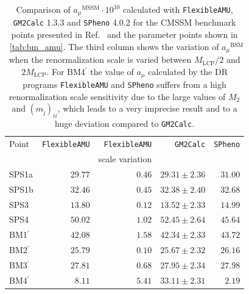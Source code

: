 \documentclass[final,3p,11pt,pdflatex]{elsarticle}
\makeatletter
\newcommand{\spheno}{\texttt{SPheno}\@\xspace}
\newcommand{\GMTCalc}{\texttt{GM2Calc}\@\xspace}
\newcommand{\famu}{\texttt{FlexibleAMU}\@\xspace}
\newcommand{\ol}[1]{\overline{#1}}
\newcommand{\DRbar}{\ensuremath{\ol{\text{DR}}}\xspace}
\newcommand{\BSM}{\ensuremath{\text{BSM}}\xspace}
\newcommand{\MSSM}{\ensuremath{\text{MSSM}}\xspace}
\newcommand{\MLCP}{\ensuremath{M_\text{LCP}}\xspace}
\newcommand{\amu}{\ensuremath{a_\mu}\xspace}
\newcommand{\amuBSM}{\ensuremath{\amu^{\BSM}}\xspace}
\newcommand{\amuMSSM}{\ensuremath{\amu^{\MSSM}}\xspace}
\newcommand{\tabref}[1]{\tablename~\ref{#1}}
\makeatother
\begin{document}
\begin{table}[tbh]
  \centering
  \begin{tabular}{lrrrr}
    \toprule
    Point & \famu & \famu           & \GMTCalc & \spheno \\
          &       & scale variation &          &         \\
    \midrule
    SPS1a  & $29.77$ & $0.46$ & $29.31 \pm 2.36$ & $31.00$ \\
    SPS1b  & $32.46$ & $0.45$ & $32.38 \pm 2.40$ & $32.68$ \\
    SPS3   & $13.80$ & $0.12$ & $13.52 \pm 2.33$ & $14.99$ \\
    SPS4   & $50.02$ & $1.02$ & $52.45 \pm 2.64$ & $45.64$ \\
    BM1$^\prime$  & $42.08$ & $1.58$ & $42.34 \pm 2.33$ & $43.72$ \\
    BM2$^\prime$  & $25.79$ & $0.10$ & $25.67 \pm 2.32$ & $26.16$ \\
    BM3$^\prime$  & $27.81$ & $0.68$ & $27.95 \pm 2.34$ & $27.98$ \\
    BM4$^\prime$  &  $8.11$ & $5.41$ & $33.11 \pm 2.31$ &  $2.19$ \\
    \bottomrule
  \end{tabular}
  \caption{Comparison of $\amuMSSM\cdot 10^{10}$ calculated with \famu,
    \GMTCalc 1.3.3 and \spheno 4.0.2 for the CMSSM benchmark points
    presented in Ref.~\cite{Allanach:2002nj} and the parameter points shown
    in \tabref{tab:bm_amu}.  The third column shows the variation
    of $\amuBSM$ when the renormalization scale is varied between
    $\MLCP/2$ and $2\MLCP$.
    For BM4$^\prime$ the value of \amu calculated by the \DRbar
    programs \famu and \spheno suffers from a high renormalization scale
    sensitivity due to the large values of $M_2$ and $(m_{\tilde{l}})_{ii}$,
    which leads to a very imprecise result and to a huge deviation
    compared to \GMTCalc.}
  \label{tab:test_famu}
\end{table}
%
\end{document}
